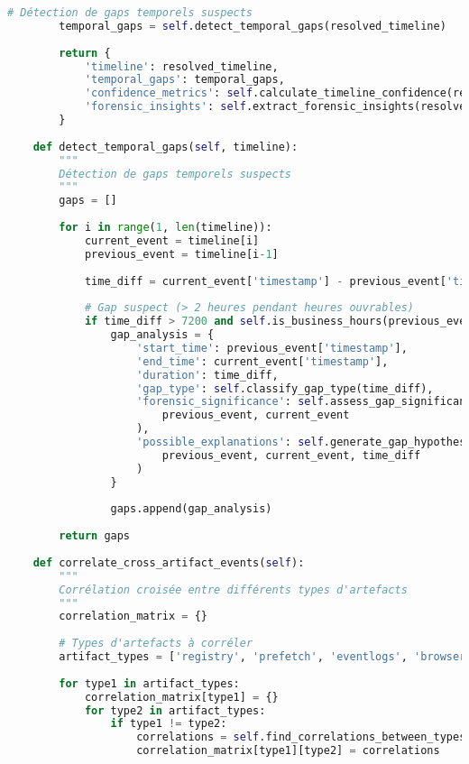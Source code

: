 \begin{lstlisting}[language=Python, caption=Reconstructeur de timeline avec validation CRO]
        # Détection de gaps temporels suspects
        temporal_gaps = self.detect_temporal_gaps(resolved_timeline)
        
        return {
            'timeline': resolved_timeline,
            'temporal_gaps': temporal_gaps,
            'confidence_metrics': self.calculate_timeline_confidence(resolved_timeline),
            'forensic_insights': self.extract_forensic_insights(resolved_timeline)
        }
    
    def detect_temporal_gaps(self, timeline):
        """
        Détection de gaps temporels suspects
        """
        gaps = []
        
        for i in range(1, len(timeline)):
            current_event = timeline[i]
            previous_event = timeline[i-1]
            
            time_diff = current_event['timestamp'] - previous_event['timestamp']
            
            # Gap suspect (> 2 heures pendant heures ouvrables)
            if time_diff > 7200 and self.is_business_hours(previous_event['timestamp']):
                gap_analysis = {
                    'start_time': previous_event['timestamp'],
                    'end_time': current_event['timestamp'],
                    'duration': time_diff,
                    'gap_type': self.classify_gap_type(time_diff),
                    'forensic_significance': self.assess_gap_significance(
                        previous_event, current_event
                    ),
                    'possible_explanations': self.generate_gap_hypotheses(
                        previous_event, current_event, time_diff
                    )
                }
                
                gaps.append(gap_analysis)
                
        return gaps
    
    def correlate_cross_artifact_events(self):
        """
        Corrélation croisée entre différents types d'artefacts
        """
        correlation_matrix = {}
        
        # Types d'artefacts à corréler
        artifact_types = ['registry', 'prefetch', 'eventlogs', 'browser', 'email']
        
        for type1 in artifact_types:
            correlation_matrix[type1] = {}
            for type2 in artifact_types:
                if type1 != type2:
                    correlations = self.find_correlations_between_types(type1, type2)
                    correlation_matrix[type1][type2] = correlations
                    

\end{lstlisting}
